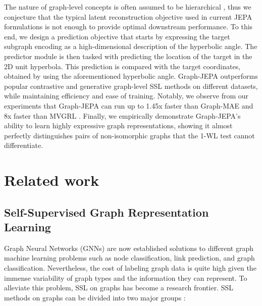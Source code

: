 \documentclass{article} \usepackage{iclr2024_conference,times}
\begin{document}
The nature of graph-level concepts is often assumed to be hierarchical \citep{ying2018hierarchical}, thus we conjecture that the typical latent reconstruction objective used in current JEPA formulations is not enough to provide optimal downstream performance. To this end, we design a prediction objective that starts by expressing the target subgraph encoding as a high-dimensional description of the hyperbolic angle. The predictor module is then tasked with predicting the location of the target in the 2D unit hyperbola. This prediction is compared with the target coordinates, obtained by using the aforementioned hyperbolic angle. Graph-JEPA outperforms popular contrastive and generative graph-level SSL methods on different datasets, while maintaining efficiency and ease of training. Notably, we observe from our experiments that Graph-JEPA can run up to 1.45x faster than Graph-MAE \citep{hou2022graphmae} and 8x faster than MVGRL \citep{hassani2020contrastive}. Finally, we empirically demonstrate Graph-JEPA's ability to learn highly expressive graph representations, showing it almost perfectly distinguishes pairs of non-isomorphic graphs that the 1-WL test cannot differentiate. 

\section{Related work}
\subsection{Self-Supervised Graph Representation Learning}
Graph Neural Networks (GNNs) \citep{scarselli2008graph, kipf2016semi, velivckovic2017graph, hamilton2017inductive, xu2018powerful, wu2019simplifying} are now established solutions to different graph machine learning problems such as node classification, link prediction, and graph classification. Nevertheless, the cost of labeling graph data is quite high given the immense variability of graph types and the information they can represent. To alleviate this problem, SSL on graphs has become a research frontier. SSL methods on graphs can be divided into two major groups \citep{liu2023sslsurvey}:
\end{document}
